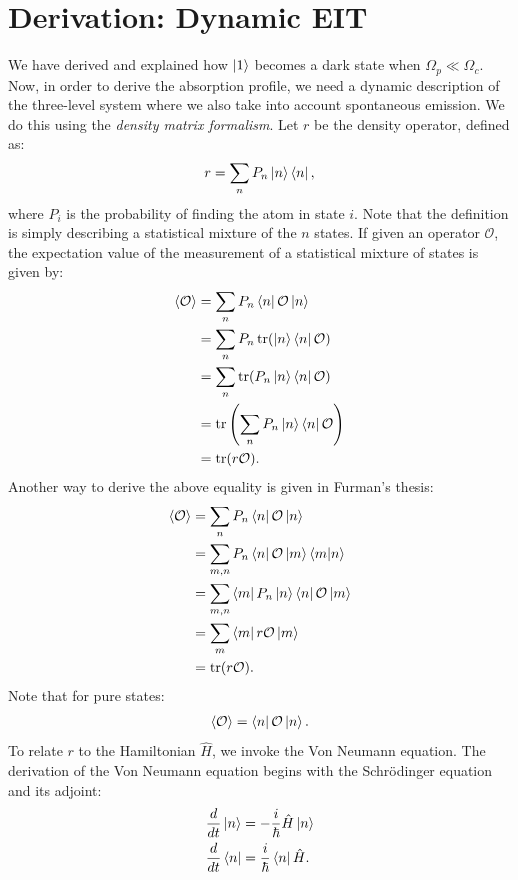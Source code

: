 \documentclass{article}
\theoremstyle{definition}
\begin{document}
\section{Derivation: Dynamic EIT}
We have derived and explained how $\ket{1}$ becomes a dark state when $\Omega_p \ll \Omega_c$. Now, in order to derive the absorption profile, we need a dynamic description of the three-level system where we also take into account spontaneous emission. We do this using the \textit{density matrix formalism}. Let $r$ be the density operator, defined as:
\begin{align}
r = \sum_{n}P_n\ket{n}\bra{n},
\end{align}
where $P_i$ is the probability of finding the atom in state $i$. Note that the definition is simply describing a statistical mixture of the $n$ states. If given an operator $\mathcal{O}$, the expectation value of the measurement of a statistical mixture of states is given by:
\begin{align}
\langle \mathcal{O}\rangle &=\sum_{n}P_n\bra{n}\mathcal{O}\ket{n}\nonumber\\
&= \sum_{n}P_n\tr(\ket{n}\bra{n}\mathcal{O})\nonumber\\
&= \sum_{n}\tr(P_n\ket{n}\bra{n}\mathcal{O})\nonumber\\
&= \tr\left( \sum_{n}P_n\ket{n}\bra{n}\mathcal{O}\right) \nonumber\\
&= \tr(r\mathcal{O}).
\end{align}
Another way to derive the above equality is given in Furman's thesis:
\begin{align}
\langle \mathcal{O}\rangle &=\sum_{n}P_n\bra{n}\mathcal{O}\ket{n}\nonumber\\
&= \sum_{m,n}P_n\bra{n}\mathcal{O}\ket{m}\bra{m}\ket{n}\nonumber\\
&= \sum_{m,n}\bra{m}P_n\ket{n}\bra{n}\mathcal{O}\ket{m}\nonumber\\
&= \sum_{m}\bra{m}r\mathcal{O}\ket{m}\nonumber\\
&= \tr(r\mathcal{O}).
\end{align}
Note that for pure states:
\begin{align}
\langle \mathcal{O} \rangle = \bra{n}\mathcal{O}\ket{n}.
\end{align}
To relate $r$ to the Hamiltonian $\hat{H}$, we invoke the Von Neumann equation. The derivation of the Von Neumann equation begins with the Schr\"{o}dinger equation and its adjoint:
\begin{align}
\frac{d}{dt}\ket{n} &= -\frac{i}{\hbar}\hat{H}\ket{n}\\
\frac{d}{dt}\bra{n} &= \frac{i}{\hbar}\bra{n}\hat{H}.
\end{align}
\end{document}
